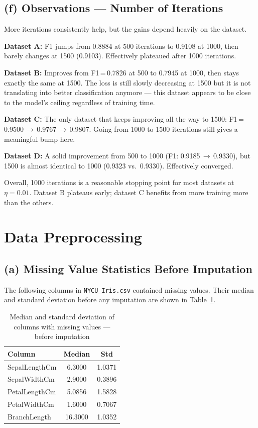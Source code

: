 \documentclass[11pt,a4paper]{article}
\begin{document}
\subsection{(f) Observations --- Number of Iterations}

More iterations consistently help, but the gains depend heavily on the dataset.

\textbf{Dataset A:} F1 jumps from 0.8884 at 500 iterations to 0.9108 at 1000, then barely changes at 1500 (0.9103). Effectively plateaued after 1000 iterations.

\textbf{Dataset B:} Improves from F1\,=\,0.7826 at 500 to 0.7945 at 1000, then stays exactly the same at 1500. The loss is still slowly decreasing at 1500 but it is not translating into better classification anymore --- this dataset appears to be close to the model's ceiling regardless of training time.

\textbf{Dataset C:} The only dataset that keeps improving all the way to 1500: F1\,=\,0.9500\,$\to$\,0.9767\,$\to$\,0.9807. Going from 1000 to 1500 iterations still gives a meaningful bump here.

\textbf{Dataset D:} A solid improvement from 500 to 1000 (F1: 0.9185\,$\to$\,0.9330), but 1500 is almost identical to 1000 (0.9323 vs.\ 0.9330). Effectively converged.

Overall, 1000 iterations is a reasonable stopping point for most datasets at $\eta = 0.01$. Dataset B plateaus early; dataset C benefits from more training more than the others.

\section{Data Preprocessing}

\subsection{(a) Missing Value Statistics Before Imputation}

The following columns in \texttt{NYCU\_Iris.csv} contained missing values. Their median and standard deviation before any imputation are shown in Table~\ref{tab:before_imputation}.

\begin{table}[H]
\centering
\caption{Median and standard deviation of columns with missing values --- before imputation}
\label{tab:before_imputation}
\begin{tabular}{lcc}
\toprule
\textbf{Column} & \textbf{Median} & \textbf{Std} \\
\midrule
SepalLengthCm  & 6.3000 & 1.0371 \\
SepalWidthCm   & 2.9000 & 0.3896 \\
PetalLengthCm  & 5.0856 & 1.5828 \\
PetalWidthCm   & 1.6000 & 0.7067 \\
BranchLength   & 16.3000 & 1.0352 \\
\bottomrule
\end{tabular}
\end{table}
\end{document}
